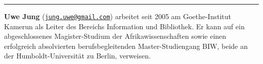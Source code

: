 \begin{center}\rule{0.5\linewidth}{\linethickness}\end{center}

\textbf{Uwe Jung}
(\href{mailto:jung.uwe@gmail.com}{\nolinkurl{jung.uwe@gmail.com}})
arbeitet seit 2005 am Goethe-Institut Kamerun als Leiter des Bereichs
Information und Bibliothek. Er kann auf ein abgeschlossenes
Magister-Studium der Afrikawissenschaften sowie einen erfolgreich
absolvierten berufsbegleitenden Master-Studiengang BIW, beide an der
Humboldt-Universität zu Berlin, verweisen.
